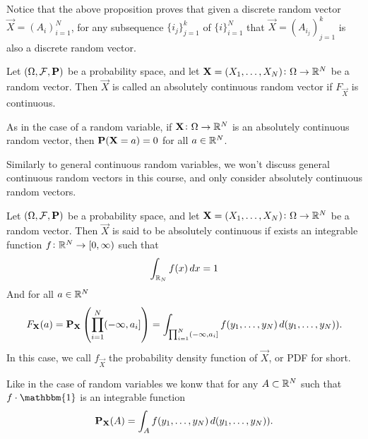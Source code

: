 \documentclass[11pt,a4paper]{article}
\begin{document}
  \begin{remark}
    Notice that the above proposition proves that given a discrete random
    vector $\vec{X} = (A_i)_{i=1}^{N}$, for any subsequence $\{i_j\}_{j=1}^{k}$ of 
    $\{i\}_{i=1}^N$ that $\vec{X} = (A_{i_j})_{j=1}^k$ is also a discrete random
    vector.
  \end{remark}

  \begin{definition}
    Let $(\Omega, \mathcal F, \mathbf{P})$ be a probability space, 
    and let $\boldsymbol{\mathbf{X}} = (X_1,\dots,X_N) \colon \Omega \to \mathbb{R}^N$ be a random vector.
    Then $\vec{X}$ is called an absolutely continuous random vector if 
    $F_{\vec{X}}$ is continuous.
  \end{definition}
  
  \begin{remark}
    As in the case of a random variable, if $\boldsymbol{\mathbf{X}} \colon \Omega \to \mathbb{R}^N$ is
    an absolutely continuous random vector, 
    then $\mathbf{P}(\boldsymbol{\mathbf{X}} = a) = 0$ for all $a \in \mathbb{R}^N$.
  \end{remark}
  
  Similarly to general continuous random variables, we won't discuss
  general continuous random vectors in this course, and only consider
  absolutely continuous random vectors.

  \begin{definition}
    Let $(\Omega, \mathcal F, \mathbf{P})$ be a probability space, 
    and let $\boldsymbol{\mathbf{X}} = (X_1,\dots,X_N) \colon \Omega \to \mathbb{R}^N$ be a random vector.
    Then $\vec{X}$ is said to be absolutely continuous if exists an integrable 
    function $f \colon \mathbb{R}^N \to [0,\infty)$ such that 
    \[
      \int_{\mathbb{R}_N} f(x)\,dx = 1
    \]
    And for all $a \in \mathbb{R}^N$
    \[
      F_{\boldsymbol{\mathbf{X}}}(a) = 
      \mathbf{P}_{\boldsymbol{\mathbf{X}}}\left(\prod_{i=1}^{N} (-\infty,a_i]\right) =
      \int_{\prod_{i=1}^{N} (-\infty,a_i]} f(y_1,\dots,y_N)\,d(y_1,\dots,y_N)).
    \]
    In this case, we call $f_{\vec{X}}$ the probability density function of 
    $\vec{X}$, or PDF for short.
  \end{definition}

  \begin{remark}
    Like in the case of random variables we konw that for any $A \subset \mathbb{R}^N$
    such that $f \cdot \mathbbm{1}$ is an integrable function
    \[
      \mathbf{P}_{\boldsymbol{\mathbf{X}}}(A) = 
      \int_{A} f(y_1,\dots,y_N)\,d(y_1,\dots,y_N)).
    \]
  \end{remark}
\end{document}
